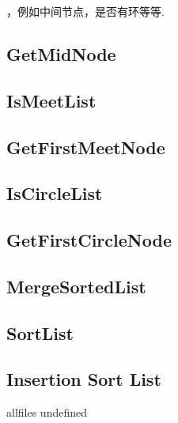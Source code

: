 \documentclass{article}
\begin{document}
\begin{CJK}{UTF8}{gbsn}     %

\else
    
，例如中间节点，是否有环等等.
\subsection{GetMidNode}

\subsection{IsMeetList}

\subsection{GetFirstMeetNode}

\subsection{IsCircleList}

\subsection{GetFirstCircleNode}

\subsection{MergeSortedList}

\subsection{SortList}

\subsection{Insertion Sort List}


\fi

\ifx allfiles undefined
\end{CJK}
\end{document}
